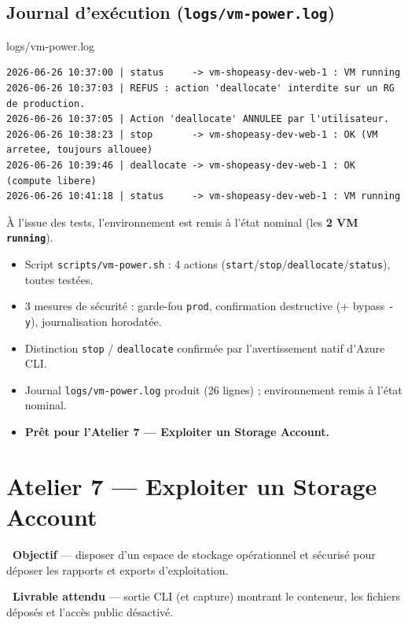 \documentclass[11pt,a4paper]{article}
\newcommand{\emo}[1]{\raisebox{-0.14em}{\twemoji{#1}}}
\newcommand{\eTarget}{\emo{1f3af}}
\newcommand{\ePackage}{\emo{1f4e6}}
\newcommand{\code}[1]{\texttt{#1}}
\begin{document}
\subsection{Journal d'exécution (\code{logs/vm-power.log})}
\begin{codebox}{logs/vm-power.log}
\begin{Verbatim}
2026-06-26 10:37:00 | status     -> vm-shopeasy-dev-web-1 : VM running
2026-06-26 10:37:03 | REFUS : action 'deallocate' interdite sur un RG de production.
2026-06-26 10:37:05 | Action 'deallocate' ANNULEE par l'utilisateur.
2026-06-26 10:38:23 | stop       -> vm-shopeasy-dev-web-1 : OK (VM arretee, toujours allouee)
2026-06-26 10:39:46 | deallocate -> vm-shopeasy-dev-web-1 : OK (compute libere)
2026-06-26 10:41:18 | status     -> vm-shopeasy-dev-web-1 : VM running
\end{Verbatim}
\end{codebox}
À l'issue des tests, l'environnement est remis à l'état nominal (les \textbf{2 VM \code{running}}).

\begin{etatbox}
\begin{itemize}
  \item Script \code{scripts/vm-power.sh} : 4 actions (\code{start}/\code{stop}/\code{deallocate}/\code{status}), toutes testées.
  \item 3 mesures de sécurité : garde-fou \code{prod}, confirmation destructive (+ bypass \code{-y}), journalisation horodatée.
  \item Distinction \code{stop} / \code{deallocate} confirmée par l'avertissement natif d'Azure CLI.
  \item Journal \code{logs/vm-power.log} produit (26 lignes) ; environnement remis à l'état nominal.
  \item \textbf{Prêt pour l'Atelier 7 — Exploiter un Storage Account.}
\end{itemize}
\end{etatbox}


\section{Atelier 7 — Exploiter un Storage Account}

\begin{fiche}
\textbf{\eTarget~Objectif} — disposer d'un espace de stockage opérationnel et sécurisé pour déposer les rapports et exports d'exploitation.

\textbf{\ePackage~Livrable attendu} — sortie CLI (et capture) montrant le conteneur, les fichiers déposés et l'accès public désactivé.
\end{fiche}
\end{document}
